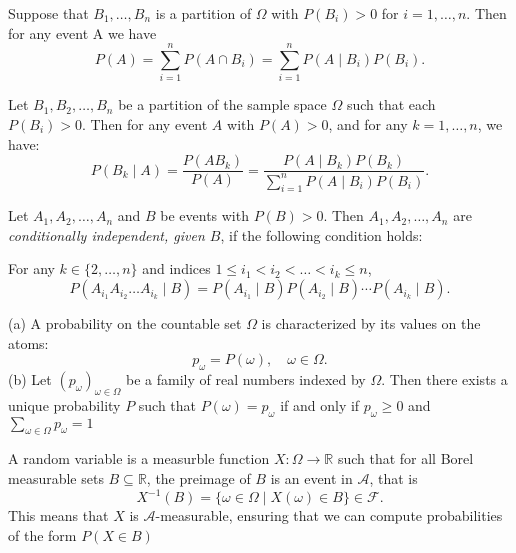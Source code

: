 \documentclass[../main.tex]{subfiles}
\begin{document}
\begin{proposition}
    Suppose that \(B_1, \dots, B_n\) is a partition of \(\Omega\) with \(P(B_i) > 0\) for \(i = 1, \dots, n.\) Then for any event A we have
    \[
    P(A) = \sum_{i=1}^n P(A \cap B_i) = \sum_{i=1}^n P(A \mid B_i)P(B_i).
    \]
    
\end{proposition}


\begin{theorem}\label{thm:bayes_formula}
Let \( B_1, B_2, \dots, B_n \) be a partition of the sample space \( \Omega \) such that each \( P(B_i) > 0 \). Then for any event \( A \) with \( P(A) > 0 \), and for any \( k = 1, \dots, n \), we have:
\[
P(B_k \mid A) = \frac{P(A B_k)}{P(A)} = \frac{P(A \mid B_k) P(B_k)}{\sum_{i=1}^{n} P(A \mid B_i) P(B_i)}.
\]
\end{theorem}





\begin{definition}\label{def:conditional_independence}
Let \( A_1, A_2, \dots, A_n \) and \( B \) be events with \( P(B) > 0 \). Then \( A_1, A_2, \dots, A_n \) are \textit{conditionally independent, given \( B \)}, if the following condition holds:

For any \( k \in \{2, \dots, n\} \) and indices \( 1 \leq i_1 < i_2 < \dots < i_k \leq n \),
\[
P(A_{i_1} A_{i_2} \dots A_{i_k} \mid B) = P(A_{i_1} \mid B) P(A_{i_2} \mid B) \cdots P(A_{i_k} \mid B).
\]
\end{definition}






\begin{theorem}
(a) A probability on the countable set $\Omega$ is characterized by its values on the atoms: 
\[
p_\omega = P({\omega}), \quad \omega \in \Omega.
\]
(b) Let $(p_\omega)_{\omega \in \Omega}$ be a family of real numbers indexed by $\Omega$.
Then there exists a unique probability $P$ such that $P({\omega}) = p_\omega$ if and only if $p_\omega \geq 0$ and $\sum_{\omega \in \Omega}{p_\omega} = 1$
\end{theorem}


\begin{definition} \label{def: Random_Variable}
A random variable is a measurble function $ X: \Omega \to \mathbb{R}$ such that for all Borel measurable sets $ B \subseteq \mathbb{R}$,
the preimage of $B$ is an event in $\mathcal{A}$, that is 
\[
X^{-1}(B) = \{ \omega \in \Omega \mid X(\omega) \in B \} \in \mathcal{F}.
\]
This means that $X$ is $\mathcal{A}$-measurable, ensuring that we can compute probabilities of the form $P(X \in B)$
\end{definition}
\end{document}
